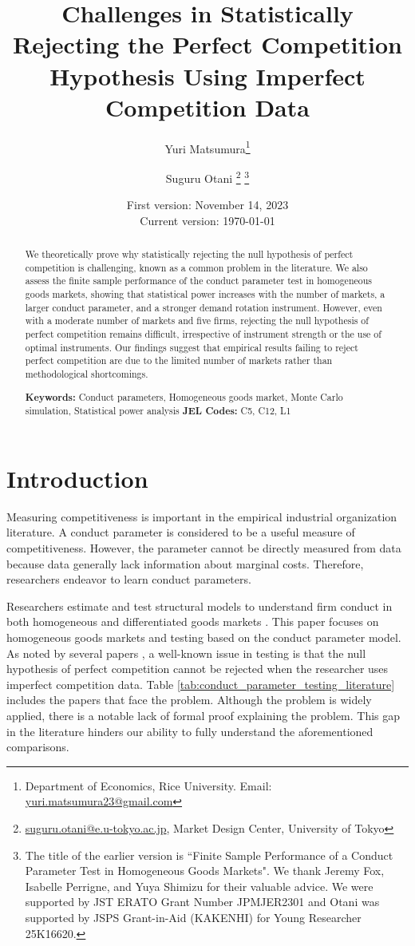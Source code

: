 \documentclass[11pt, a4paper]{article}
\title{Challenges in Statistically Rejecting the Perfect Competition Hypothesis Using Imperfect Competition Data}
\author{Yuri Matsumura\thanks{Department of Economics, Rice University. Email: \href{mailto:}{yuri.matsumura23@gmail.com}} \and Suguru Otani \thanks{\href{mailto:}{suguru.otani@e.u-tokyo.ac.jp}, Market Design Center, University of Tokyo
}
\thanks{
The title of the earlier version is ``Finite Sample Performance of a Conduct Parameter Test in Homogeneous Goods Markets".
We thank Jeremy Fox, Isabelle Perrigne, and Yuya Shimizu for their valuable advice. We were supported by JST ERATO Grant Number JPMJER2301 and Otani was supported by JSPS Grant-in-Aid (KAKENHI) for Young Researcher 25K16620.}}
\date{
First version: November 14, 2023\\
Current version: \today
}
\begin{document}
\maketitle
\begin{abstract}
    We theoretically prove why statistically rejecting the null hypothesis of perfect competition is challenging, known as a common problem in the literature. We also assess the finite sample performance of the conduct parameter test in homogeneous goods markets, showing that statistical power increases with the number of markets, a larger conduct parameter, and a stronger demand rotation instrument. However, even with a moderate number of markets and five firms, rejecting the null hypothesis of perfect competition remains difficult, irrespective of instrument strength or the use of optimal instruments. Our findings suggest that empirical results failing to reject perfect competition are due to the limited number of markets rather than methodological shortcomings.
\vspace{0.1in}

\noindent\textbf{Keywords:} Conduct parameters, Homogeneous goods market, Monte Carlo simulation, Statistical power analysis
\vspace{0in}
\newline
\noindent\textbf{JEL Codes:} C5, C12, L1

\bigskip
\end{abstract}

\newpage
\section{Introduction}
Measuring competitiveness is important in the empirical industrial organization literature.
A conduct parameter is considered to be a useful measure of competitiveness. 
However, the parameter cannot be directly measured from data because data generally lack information about marginal costs.
Therefore, researchers endeavor to learn conduct parameters.

Researchers estimate and test structural models to understand firm conduct in both homogeneous and differentiated goods markets \citep{bresnahan1982oligopoly,nevoIdentificationOligopolySolution1998, magnolfi2022comparison, duarteTesting2024}.
This paper focuses on homogeneous goods markets and testing based on the conduct parameter model.
As noted by several papers \citep{genesove1998testing, steen1999testing, shaffer1993test}, a well-known issue in testing is that the null hypothesis of perfect competition cannot be rejected when the researcher uses imperfect competition data.
Table \ref{tab:conduct_parameter_testing_literature} includes the papers that face the problem.
Although the problem is widely applied, there is a notable lack of formal proof explaining the problem.
This gap in the literature hinders our ability to fully understand the aforementioned comparisons.
\end{document}

